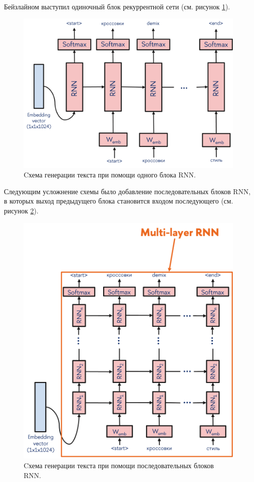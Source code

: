 \documentclass[a4paper,12pt]{extarticle}
\begin{document}
Бейзлайном выступил одиночный блок рекуррентной сети (см. рисунок \ref{fig:rnn_one}).
\begin{figure}[ht]
	\centering
	\includegraphics[scale=0.7]{rnn_one.png}
	\caption{Cхема генерации текста при помощи одного блока RNN.}
	\label{fig:rnn_one}
\end{figure}
Следующим усложнение схемы было добавление последовательных блоков RNN, в которых выход предыдущего блока становится входом последующего (см. рисунок \ref{fig:rnn-multilayer}).
\begin{figure}[ht]
	\centering
	\includegraphics[scale=0.7]{rnn-multilayer.png}
	\caption{Cхема генерации текста при помощи последовательных блоков RNN.}
	\label{fig:rnn-multilayer}
\end{figure}
\end{document}
